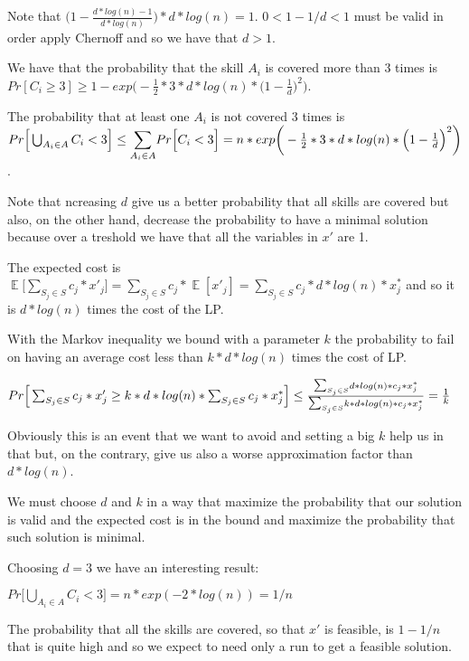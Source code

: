 \documentclass[paper=a4, fontsize=11pt]{scrartcl} %
\numberwithin{equation}{section} %
\numberwithin{figure}{section} %
\numberwithin{table}{section} %
\DeclareMathOperator*{\E}{\mathbb{E}}
\begin{document}
Note that $\Big(1 - \frac{d*log(n) -1}{d*log(n)}\Big)*d*log(n) = 1$. $0 < 1 - 1/d < 1$ must be valid in order apply Chernoff and so we have that $d > 1$.

We have that the probability that the skill $A_i$ is covered more than 3 times is $Pr[C_i \geq 3] \geq 1 - exp\bigg(-\frac{1}{2}*3*d*log(n)*\Big(1 - \frac{1}{d}\Big)^2\bigg)$.


The probability that at least one $A_i$ is not covered 3 times is $Pr\Big[\bigcup_{A_i \in A} C_i < 3\Big] \leq \mathlarger{\sum}_{A_i \in A} Pr\Big[C_i < 3\Big] = n*exp\bigg(-\frac{1}{2}*3*d*log(n)*\Big(1 - \frac{1}{d}\Big)^2\bigg)$.

Note that ncreasing $d$ give us a better probability that all skills are covered but also, on the other hand, decrease the probability to have a minimal solution because over a treshold we have that all the variables in $x'$ are 1.

The expected cost is $\E\big[\sum_{S_j \in S} c_j*x'_j\big] = \sum_{S_j \in S} c_j*\E[x'_j] = \sum_{S_j \in S} c_j*d*log(n)*x^*_j$ and so it is $d*log(n)$ times the cost of the LP.

With the Markov inequality we bound with a parameter $k$ the probability to fail on having an average cost less than $k*d*log(n)$ times the cost of LP.

\bigskip
$Pr\Big[\sum_{S_j \in S} c_j*x'_j \geq k*d*log(n)*\sum_{S_j \in S} c_j*x^*_j\Big] \leq
\frac{\mathlarger{\sum}_{S_j \in S} d*log(n)*c_j*x^*_j}{\mathlarger{\sum}_{S_j \in S} k*d*log(n)*c_j*x^*_j} = \frac{1}{k}$
\bigskip

Obviously this is an event that we want to avoid and setting a big $k$ help us in that but, on the contrary, give us also a worse approximation factor than $d*log(n)$.

We must choose $d$ and $k$ in a way that maximize the probability that our solution is valid and the expected cost is in the bound and maximize the probability that such solution is minimal.

Choosing $d = 3$ we have an interesting result:

$Pr\Big[\bigcup_{A_i \in A} C_i < 3\Big] = n*exp(-2*log(n)) = 1/n$

The probability that all the skills are covered, so that $x'$ is feasible, is $1 - 1/n$ that is quite high and so we expect to need only a run to get a feasible solution.
\end{document}
